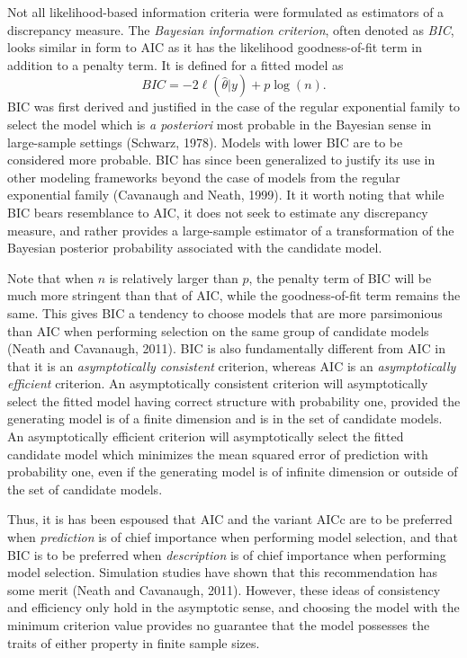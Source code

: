 		Not all likelihood-based information criteria were formulated as estimators of a discrepancy measure. The \textit{Bayesian information criterion}, often denoted as \textit{BIC}, looks similar in
		form to AIC as it has the likelihood goodness-of-fit term in addition to a penalty term. It is defined for a fitted model as
		\begin{equation*}
			BIC = -2 \ell(\hat{\theta}|y) + p \log (n).
		\end{equation*}
		BIC was first derived and justified in the case of the regular exponential family to select the model which is \textit{a posteriori} most probable in the Bayesian sense in
		large-sample settings (Schwarz, 1978). Models with lower BIC are to be considered more probable. BIC has since been generalized to justify its use in other modeling frameworks beyond
		the case of models from the regular exponential family (Cavanaugh and Neath, 1999). It it worth noting that while BIC bears resemblance to AIC, it does not seek to estimate any discrepancy
		measure, and rather provides a large-sample estimator of a transformation of the Bayesian posterior probability associated with the candidate model.

		Note that when $n$ is relatively larger than $p$, the penalty term of BIC will be much more stringent than that of AIC, while the goodness-of-fit term remains the same. This gives BIC a tendency to
		choose models that are more parsimonious than AIC when performing selection on the same group of candidate models (Neath and Cavanaugh, 2011). BIC is also fundamentally different
		from AIC in that it is an \textit{asymptotically consistent} criterion,  whereas AIC is an \textit{asymptotically efficient} criterion. An asymptotically consistent criterion will asymptotically
		select the fitted model having correct structure with probability one, provided the generating model is of a finite dimension and is in the set of candidate models. An asymptotically efficient
		criterion will asymptotically select the fitted candidate model which minimizes the mean squared error of prediction with probability one, even if the generating model is of infinite dimension
		or outside of the set of candidate models.

		Thus, it is has been espoused that AIC and the variant AICc are to be preferred when \textit{prediction} is of chief importance when performing model selection, and that BIC is to be preferred
		when \textit{description} is of chief importance when performing model selection. Simulation studies have shown that this recommendation has some merit (Neath and Cavanaugh, 2011). However, these
		ideas of consistency and efficiency only hold in the asymptotic sense, and choosing the model with the minimum criterion value provides no guarantee that the model possesses the traits of either
		property in finite sample sizes.
		
